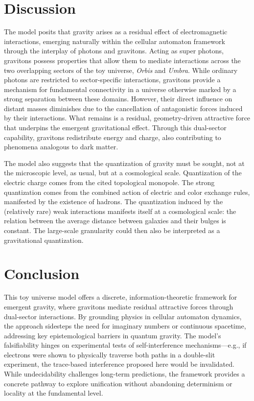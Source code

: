 \documentclass[12pt]{article}
\begin{document}
\section{Discussion} \label{emergence}
The model posits that gravity arises as a residual effect of electromagnetic interactions, emerging naturally within the cellular automaton framework through the interplay of photons and gravitons. Acting as super photons, gravitons possess properties that allow them to mediate interactions across the two overlapping sectors of the toy universe, \emph{Orbis} and \emph{Umbra}. While ordinary photons are restricted to sector-specific interactions, gravitons provide a mechanism for fundamental connectivity in a universe otherwise marked by a strong separation between these domains. However, their direct influence on distant masses diminishes due to the cancellation of antagonistic forces induced by their interactions. What remains is a residual, geometry-driven attractive force that underpins the emergent gravitational effect. Through this dual-sector capability, gravitons redistribute energy and charge, also contributing to phenomena analogous to dark matter.

The model also suggests that the quantization of gravity must be sought, not at the microscopic level, as usual, but at a cosmological scale. Quantization of the electric charge comes from the cited topological monopole. The strong quantization comes from the combined action of electric and color exchange rules, manifested by the existence of hadrons. The quantization induced by the (relatively rare) weak interactions manifests itself at a cosmological scale: the relation between the average distance between galaxies and their bulges is constant. The large-scale granularity could then also be interpreted as a gravitational quantization.

\section{Conclusion}
This toy universe model offers a discrete, information-theoretic framework for emergent gravity, where gravitons mediate residual attractive forces through dual-sector interactions. By grounding physics in cellular automaton dynamics, the approach sidesteps the need for imaginary numbers or continuous spacetime, addressing key epistemological barriers in quantum gravity. The model’s falsifiability hinges on experimental tests of self-interference mechanisms—e.g., if electrons were shown to physically traverse both paths in a double-slit experiment, the trace-based interference proposed here would be invalidated. While undecidability challenges long-term predictions, the framework provides a concrete pathway to explore unification without abandoning determinism or locality at the fundamental level.



\end{document}
